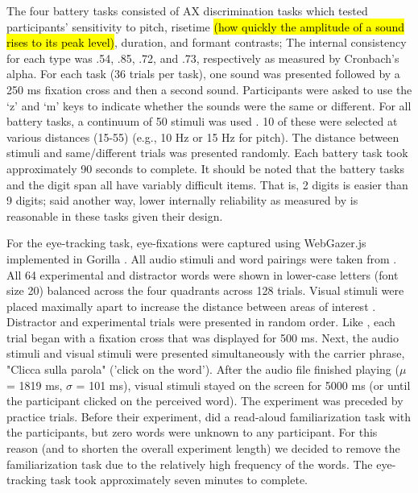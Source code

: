 The four battery tasks consisted of AX discrimination tasks which tested participants' sensitivity to pitch, risetime \hl{(how quickly the amplitude of a sound rises to its peak level)}, duration, and formant contrasts; The internal consistency for each type was .54, .85, .72, and .73, respectively as measured by Cronbach's alpha. For each task (36 trials per task), one sound was presented followed by a 250 ms fixation cross and then a second sound. Participants were asked to use the `z' and `m' keys to indicate whether the sounds were the same or different. For all battery tasks, a continuum of 50 stimuli was used \citep{Kachlicka_Saito_Tierney_2019}. 10 of these were selected at various distances (15-55) (e.g., 10 Hz or 15 Hz for pitch). The distance between stimuli and same/different trials was presented randomly. Each battery task took approximately 90 seconds to complete. It should be noted that the battery tasks and the digit span all have variably difficult items. That is, 2 digits is easier than 9 digits; said another way, lower internally reliability as measured by \citep{Cronbach1951} is reasonable in these tasks given their design. 

For the eye-tracking task, eye-fixations were captured using WebGazer.js \citep{Papoutsaki} implemented in Gorilla \citep{Anwyl-Irvine_2019}. All audio stimuli and word pairings were taken from \cite{Sulpizio_McQueen_2012}. All 64 experimental and distractor words were shown in lower-case letters (font size 20) balanced across the four quadrants across 128 trials. Visual stimuli were placed maximally apart to increase the distance between areas of interest \citep{bramlett_wiener_24-AOW}. Distractor and experimental trials were presented in random order. Like \cite{Sulpizio_McQueen_2012}, each trial began with a fixation cross that was displayed for 500 ms. Next, the audio stimuli and visual stimuli were presented simultaneously with the carrier phrase, "Clicca sulla parola" ('click on the word'). After the audio file finished playing ($\mu$ = 1819 ms, $\sigma$ = 101 ms), visual stimuli stayed on the screen for 5000 ms (or until the participant clicked on the perceived word). The experiment was preceded by practice trials. Before their experiment, \cite{Sulpizio_McQueen_2012} did a read-aloud familiarization task with the participants, but zero words were unknown to any participant. For this reason (and to shorten the overall experiment length) we decided to remove the familiarization task due to the relatively high frequency of the words. The eye-tracking task took approximately seven minutes to complete.

